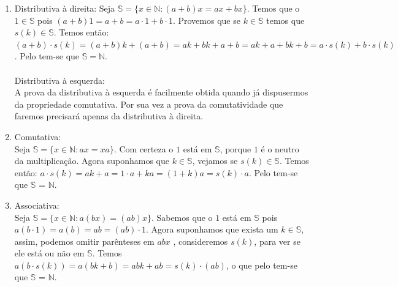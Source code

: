 \documentclass[../main.tex]{subfiles}
\begin{document}
\begin{dem}
\begin{enumerate}[label=(\roman*)]
        \item Distributiva à direita: 
            Seja $\mathbb{S} = \{ x \in \mathbb{N} : ( a + b ) x = ax + bx \}$. Temos que o $1 \in \mathbb{S}$ pois $( a + b ) 1 = a + b = a \cdot 1 + b \cdot 1$. Provemos que se $k \in \mathbb{S}$ temos que $s(k) \in \mathbb{S}$. Temos então: \\
            $( a + b ) \cdot s(k)= ( a + b ) k + ( a + b ) = ak + bk + a + b = ak + a + bk + b 
            = a \cdot s(k) + b \cdot s(k)$. Pelo  tem-se que $\mathbb{S} = \mathbb{N}$.
            \\ \\
            Distributiva à esquerda: \\
            A prova da distributiva à esquerda é facilmente obtida quando já dispusermos da propriedade comutativa. Por sua vez a prova da comutatividade que faremos precisará apenas da distributiva à direita.
        \item Comutativa: \\
            Seja $\mathbb{S} = \{ x \in \mathbb{N} : ax = xa \}$. Com certeza o $1$ está em $\mathbb{S}$, porque $1$ é o neutro da multiplicação. Agora suponhamos que $k \in \mathbb{S}$, vejamos se $s(k) \in \mathbb{S}$. Temos então: $a \cdot s(k) = ak + a = 1 \cdot a + ka = (1+k)a = s(k) \cdot a$. Pelo  tem-se que $\mathbb{S}$ = $\mathbb{N}$.

        \item Associativa:  \\
            Seja $\mathbb{S} = \{ x \in \mathbb{N} : a(bx) = (ab)x \}$. Sabemos que o $1$ está em $\mathbb{S}$ pois $a (b \cdot 1) = a(b) = ab = (ab)\cdot 1$.
            Agora suponhamos que exista um $k \in \mathbb{S}$, assim, podemos omitir parênteses em $abx$ , consideremos $s(k)$, para ver se ele está ou não em $\mathbb{S}$. Temos
            $a(b \cdot s(k)) = a(bk + b) = abk + ab = s(k) \cdot  (ab)$, o que pelo  tem-se que $\mathbb{S}$ = $\mathbb{N}$. 
            

\end{enumerate}
\end{dem}
\end{document}
